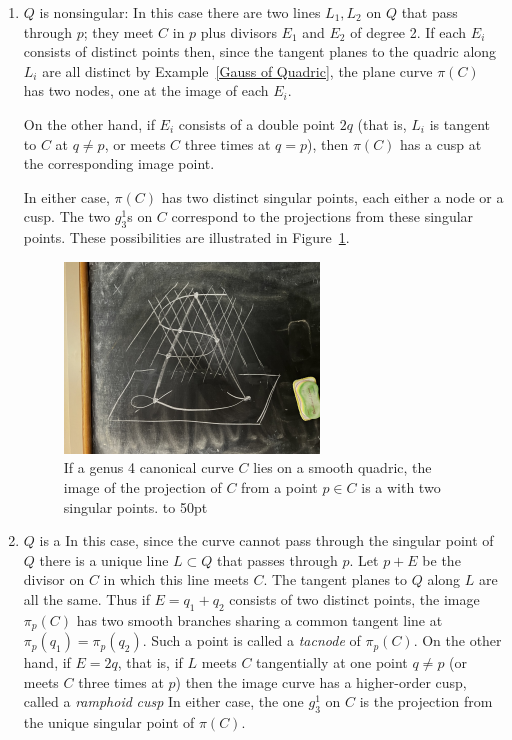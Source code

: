 \begin{enumerate}
\item $Q$ is nonsingular:
In this case there are two lines $L_1, L_2$ on $Q$ that pass through
$p$; they meet $C$ in $p$ plus divisors $E_1$ and $E_2$ of degree 2.
If each $E_i$ consists of distinct points then, since the tangent
planes to the quadric along $L_i$ are all distinct by
Example~\ref{Gauss of Quadric}, the plane curve $\pi(C)$ has two
nodes, one at the image of each $E_i$.

On the other hand, if $E_i$ consists of a double point $2q$ (that is,
$L_i$ is tangent to $C$ at $q\neq p$, or meets $C$ three times at
$q=p$), then $\pi(C)$ has a cusp at the corresponding image point.

In either case, $\pi(C)$ has two distinct singular points, each either a
node or a cusp. The two $g^1_3$s on $C$ correspond to the
projections from these singular points. These possibilities are
illustrated in Figure~\ref{Fig8.2A}.

\begin{figure}[b]
\inprogress
\centerline {\includegraphics[height=2in]{"canonical-projected-2"}}
\caption{If a genus 4 canonical curve $C$ lies on a smooth quadric, the image of the projection of $C$ from a point $p\in C$
is a
%
with two singular points.
\hbox to 50pt{} %
}
\label{Fig8.2A}
\end{figure}

\item $Q$ is a
%
In this case, since the curve cannot pass through the singular point
of $Q$ there is a unique line $L\subset Q$ that passes through $p$.
Let $p+E$ be the divisor on $C$ in which this line meets $C$. The
tangent planes to $Q$ along $L$ are all the same. Thus if
$E = q_1+q_2$ consists of two distinct points,
the image $\pi_p(C)$ has two smooth branches sharing a common tangent line at
$\pi_p(q_1) = \pi_p(q_2)$. Such a point is called a \emph{tacnode}
%
of $\pi_p(C)$. On the other hand, if $E= 2q$, that is, if $L$ meets $C$
tangentially at one point $q\neq p$ (or meets $C$ three times at $p$) then
the image curve has a higher-order cusp, called a \emph{ramphoid}
\emph{cusp}
%
%
In either case, the one $g^1_3$ on $C$ is the projection from the
unique singular point of $\pi(C)$.
\end{enumerate}

